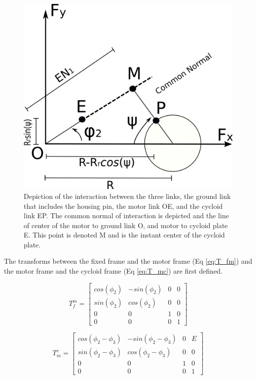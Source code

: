 \begin{figure}[h]
   \centering
   \includegraphics[width=0.60\linewidth]{fig/single_stage_angles}
   \caption{Depiction of the interaction between the three links, the ground link that includes the housing pin, the motor link OE, and the cycloid link EP. The common normal of interaction is depicted and the line of center of the motor to ground link O, and motor to cycloid plate E. This point is denoted M and is the instant center of the cycloid plate.}
   \label{fig:single_angles}
\end{figure}

The transforms between the fixed frame and the motor frame (Eq \ref{eq:T_fm}) and the motor frame and the cycloid frame (Eq \ref{eq:T_mc}) are first defined. 

\begin{equation} \label{eq:T_fm}
T_f^m = \left[{\begin{array}{cccc}
		cos(\phi_2) & -sin(\phi_2) & 0 & 0\\
		sin(\phi_2) & cos(\phi_2) & 0 & 0\\
		0 & 0 & 1 & 0\\
		0 & 0 & 0 & 1 \end{array} } \right]
\end{equation}

\begin{equation} \label{eq:T_mc}
T_m^c = \left[{\begin{array}{cccc}
		cos(\phi_2 - \phi_3) & -sin(\phi_2 - \phi_3) & 0 & E\\
		sin(\phi_2 - \phi_3) & cos(\phi_2 - \phi_3) & 0 & 0\\
		0 & 0 & 1 & 0\\
		0 & 0 & 0 & 1 \end{array} } \right]
\end{equation}

